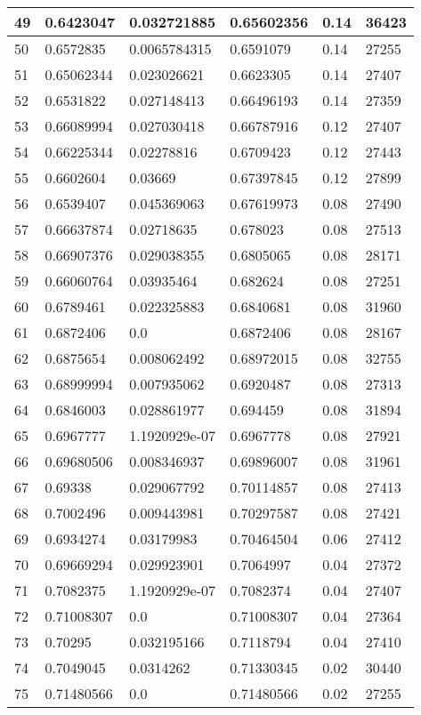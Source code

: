 \begin{longtable}{|l|l|l|l|l|l|}
49 & 0.6423047 & 0.032721885 & 0.65602356 & 0.14 & 36423 \\ \hline 
50 & 0.6572835 & 0.0065784315 & 0.6591079 & 0.14 & 27255 \\ \hline 
51 & 0.65062344 & 0.023026621 & 0.6623305 & 0.14 & 27407 \\ \hline 
52 & 0.6531822 & 0.027148413 & 0.66496193 & 0.14 & 27359 \\ \hline 
53 & 0.66089994 & 0.027030418 & 0.66787916 & 0.12 & 27407 \\ \hline 
54 & 0.66225344 & 0.02278816 & 0.6709423 & 0.12 & 27443 \\ \hline 
55 & 0.6602604 & 0.03669 & 0.67397845 & 0.12 & 27899 \\ \hline 
56 & 0.6539407 & 0.045369063 & 0.67619973 & 0.08 & 27490 \\ \hline 
57 & 0.66637874 & 0.02718635 & 0.678023 & 0.08 & 27513 \\ \hline 
58 & 0.66907376 & 0.029038355 & 0.6805065 & 0.08 & 28171 \\ \hline 
59 & 0.66060764 & 0.03935464 & 0.682624 & 0.08 & 27251 \\ \hline 
60 & 0.6789461 & 0.022325883 & 0.6840681 & 0.08 & 31960 \\ \hline 
61 & 0.6872406 & 0.0 & 0.6872406 & 0.08 & 28167 \\ \hline 
62 & 0.6875654 & 0.008062492 & 0.68972015 & 0.08 & 32755 \\ \hline 
63 & 0.68999994 & 0.007935062 & 0.6920487 & 0.08 & 27313 \\ \hline 
64 & 0.6846003 & 0.028861977 & 0.694459 & 0.08 & 31894 \\ \hline 
65 & 0.6967777 & 1.1920929e-07 & 0.6967778 & 0.08 & 27921 \\ \hline 
66 & 0.69680506 & 0.008346937 & 0.69896007 & 0.08 & 31961 \\ \hline 
67 & 0.69338 & 0.029067792 & 0.70114857 & 0.08 & 27413 \\ \hline 
68 & 0.7002496 & 0.009443981 & 0.70297587 & 0.08 & 27421 \\ \hline 
69 & 0.6934274 & 0.03179983 & 0.70464504 & 0.06 & 27412 \\ \hline 
70 & 0.69669294 & 0.029923901 & 0.7064997 & 0.04 & 27372 \\ \hline 
71 & 0.7082375 & 1.1920929e-07 & 0.7082374 & 0.04 & 27407 \\ \hline 
72 & 0.71008307 & 0.0 & 0.71008307 & 0.04 & 27364 \\ \hline 
73 & 0.70295 & 0.032195166 & 0.7118794 & 0.04 & 27410 \\ \hline 
74 & 0.7049045 & 0.0314262 & 0.71330345 & 0.02 & 30440 \\ \hline 
75 & 0.71480566 & 0.0 & 0.71480566 & 0.02 & 27255 \\ \hline 
\end{longtable}